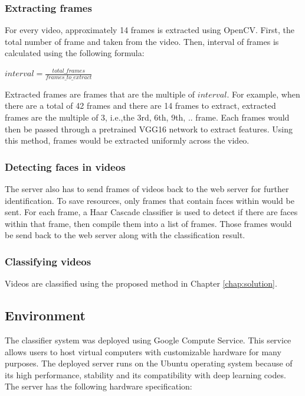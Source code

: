 \subsubsection{Extracting frames}
For every video, approximately 14 frames is extracted using OpenCV. First, the total number of frame and taken from the video. Then, interval of frames is calculated using the following formula:
\begin{center}
$interval = \frac{total\_frames}{frames\_to\_extract}$
\end{center}
Extracted frames are frames that are the multiple of $interval$. For example, when there are a total of
42 frames and there are 14 frames to extract, extracted frames are the multiple of 3, i.e.,the 3rd, 6th, 9th, .. frame. Each frames would then be passed through a pretrained VGG16 network to extract features. Using this method, frames would be extracted uniformly across the video.
\subsubsection{Detecting faces in videos}
The server also has to send frames of videos back to the web server for further identification. To save resources, only frames that contain faces within would be sent. For each frame, a Haar Cascade classifier is used to detect if there are faces within that frame, then compile them into a list of frames. Those frames would be send back to the web server along with the classification result.
\subsubsection{Classifying videos}
Videos are classified using the proposed method in Chapter \ref{chap:solution}.
\subsection{Environment}
The classifier system was deployed using Google Compute Service. This service allows users to host virtual computers with customizable hardware for many purposes. The deployed server runs on the Ubuntu operating system because of its high performance, stability and its compatibility with deep learning codes. The server has the following hardware specification:

